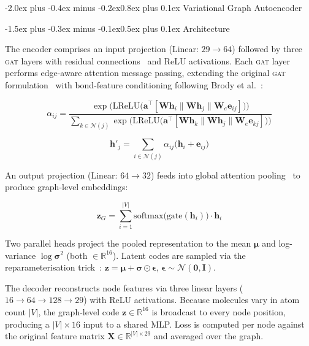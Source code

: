 \documentclass[10pt,a4paper,twocolumn]{article}
\makeatletter
\newcommand{\gat}{\textsc{gat}}
\renewcommand\subsection{\@startsection{subsection}{2}{\z@}%
  {-2.0ex plus -0.4ex minus -0.2ex}{0.8ex plus 0.1ex}%
  {\normalfont\large\bfseries}}
\renewcommand\subsubsection{\@startsection{subsubsection}{3}{\z@}%
  {-1.5ex plus -0.3ex minus -0.1ex}{0.5ex plus 0.1ex}%
  {\normalfont\normalsize\bfseries}}
\makeatother
\begin{document}
\subsection{Variational Graph Autoencoder}
\label{sec:vgae}

\subsubsection{Architecture}

The encoder comprises an input projection (Linear: $29 \to 64$) followed by three \gat{} layers with residual connections~\cite{he2016} and ReLU activations. Each \gat{} layer performs edge-aware attention message passing, extending the original \gat{} formulation~\cite{velickovic2018} with bond-feature conditioning following Brody et al.~\cite{brody2022}:

{\small
\begin{equation}
    \alpha_{ij} = \frac{
      \exp\!\bigl(\mathrm{LReLU}\bigl(\mathbf{a}^{\!\top}\!
        [\mathbf{Wh}_i \| \mathbf{Wh}_j \| \mathbf{W}_{\!e}\mathbf{e}_{ij}]\bigr)\bigr)
    }{
      \sum_{k \in \mathcal{N}(j)}
      \exp\!\bigl(\mathrm{LReLU}\bigl(\mathbf{a}^{\!\top}\!
        [\mathbf{Wh}_k \| \mathbf{Wh}_j \| \mathbf{W}_{\!e}\mathbf{e}_{kj}]\bigr)\bigr)
    }
\label{eq:attention}
\end{equation}
}

\begin{equation}
    \mathbf{h}'_j = \sum_{i \in \mathcal{N}(j)} \alpha_{ij} \bigl(\mathbf{h}_i + \mathbf{e}_{ij}\bigr)
\label{eq:aggregate}
\end{equation}

An output projection (Linear: $64 \to 32$) feeds into global attention pooling~\cite{li2016} to produce graph-level embeddings:

\begin{equation}
    \mathbf{z}_G = \sum_{i=1}^{|V|} \text{softmax}\!\bigl(\text{gate}(\mathbf{h}_i)\bigr) \cdot \mathbf{h}_i
\label{eq:pooling}
\end{equation}

Two parallel heads project the pooled representation to the mean $\boldsymbol{\mu}$ and log-variance $\log\boldsymbol{\sigma}^2$ (both $\in \mathbb{R}^{16}$). Latent codes are sampled via the reparameterisation trick~\cite{kingma2014}: $\mathbf{z} = \boldsymbol{\mu} + \boldsymbol{\sigma} \odot \boldsymbol{\epsilon}$, $\boldsymbol{\epsilon} \sim \mathcal{N}(\mathbf{0}, \mathbf{I})$.

The decoder reconstructs node features via three linear layers ($16 \to 64 \to 128 \to 29$) with ReLU activations. Because molecules vary in atom count $|V|$, the graph-level code $\mathbf{z} \in \mathbb{R}^{16}$ is broadcast to every node position, producing a $|V| \times 16$ input to a shared MLP. Loss is computed per node against the original feature matrix $\mathbf{X} \in \mathbb{R}^{|V| \times 29}$ and averaged over the graph.
\end{document}
